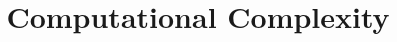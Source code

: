 \documentclass{article}
\title{Computational Complexity}
\author{}
\date{}
\begin{document}
\maketitle
\newpage
\tableofcontents

\small


\newpage

\newpage

\newpage

\newpage

\newpage

\newpage

\newpage

\newpage

\newpage

\newpage

\newpage

\newpage

\end{document}
